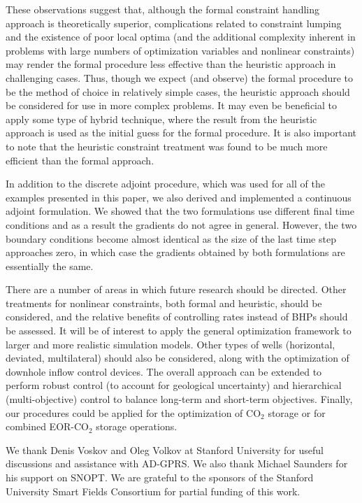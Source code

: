 \documentclass[twocolumn,numbook]{svjour3}          %
\begin{document}
These observations suggest that, although the formal constraint handling approach is theoretically superior, complications related to constraint lumping and the existence of poor local optima (and the additional complexity inherent in problems with large numbers of optimization variables and nonlinear constraints) may render the formal procedure less effective than the heuristic approach in challenging cases. Thus, though we expect (and observe) the formal procedure to be the method of choice in relatively simple cases, the heuristic approach should be considered for use in more complex problems. It may even be beneficial to apply some type of hybrid technique, where the result from the heuristic approach is used as the initial guess for the formal procedure. It is also important to note that the heuristic constraint treatment was found to be much more efficient than the formal approach. 


In addition to the discrete adjoint procedure, which was used for all of the
examples presented in this paper, we also derived and implemented a continuous
adjoint formulation. We showed that the two formulations use different
final time conditions and as a result the gradients do not
agree in general. However, the two boundary conditions become almost identical as the
size of the last time step approaches zero, in which case the gradients obtained by
both formulations are essentially the same.

There are a number of areas in which future research should be directed. Other
treatments for nonlinear constraints, both formal and heuristic, should be
considered, and the relative benefits of controlling rates instead of BHPs
should be assessed. It will be of interest to apply the general optimization
framework to larger and more realistic simulation models. Other types of wells
(horizontal, deviated, multilateral) should also be considered, along with the
optimization of downhole inflow control devices. The overall approach can be 
extended to perform robust control (to account for geological uncertainty) and hierarchical
(multi-objective) control to balance long-term and short-term objectives. Finally, our procedures could be applied for the optimization of CO$_2$ storage or for combined
EOR-CO$_2$ storage operations.



\begin{acknowledgements} 
We thank Denis Voskov and Oleg Volkov at Stanford
University for useful discussions and assistance with AD-GPRS.
We also thank Michael Saunders for his support 
on SNOPT. We are grateful
to the sponsors of the Stanford University Smart Fields Consortium for partial
funding of this work.
\end{acknowledgements}
\end{document}
